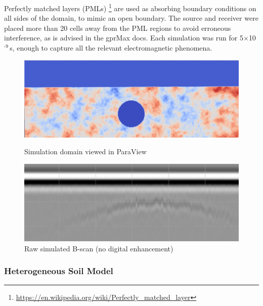             \noindent Perfectly matched layers (PMLs) \footnote{\url{https://en.wikipedia.org/wiki/Perfectly_matched_layer}} are used as absorbing boundary conditions on all sides of the domain, to mimic an open boundary. The source and receiver were placed more than 20 cells away from the PML regions to avoid erroneous interference, as is advised in the gprMax docs. Each simulation was run for 5$\times$10$^{\text{-9}}$\,s, enough to capture all the relevant electromagnetic phenomena.
            \begin{figure}[htbp]
            \centering
            \begin{minipage}[b]{0.48\textwidth}
                \centering
                \includegraphics[width=\textwidth]{figs/Rory/radar_domain.pdf}
                \caption[Simulation domain]{Simulation domain viewed in ParaView }
                \label{fig:radar_domain}
            \end{minipage}
            \hfill
            \begin{minipage}[b]{0.48\textwidth}
                \centering
                \includegraphics[width=\textwidth]{figs/Rory/sim_bscan_cropped.png}
                \caption{Raw simulated B-scan (no digital enhancement)}
                \label{fig:original_bscan}
            \end{minipage}
        \end{figure}    
    \subsubsection{Heterogeneous Soil Model}
    
